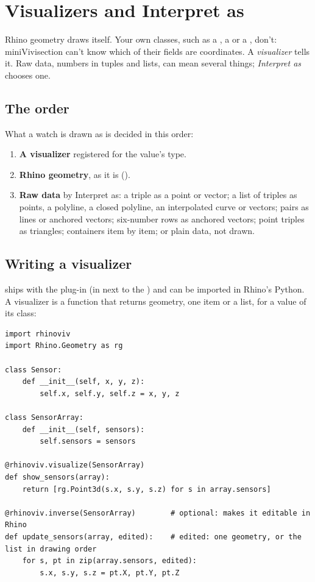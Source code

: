 \chapter{Visualizers and Interpret as}\label{ch:visualizers}

Rhino geometry draws itself. Your own classes, such as a , a  or a , don't:
miniVivisection can't know which of their fields are coordinates. A \emph{visualizer} tells it. Raw data,
numbers in tuples and lists, can mean several things; \emph{Interpret as} chooses one.

\section{The order}

What a watch is drawn as is decided in this order:

\begin{enumerate}[label=\arabic*.]
  \item \textbf{A visualizer} registered for the value's type.
  \item \textbf{Rhino geometry}, as it is ().
  \item \textbf{Raw data} by Interpret as: a triple as a point or vector; a list of triples as points, a
        polyline, a closed polyline, an interpolated curve or vectors; pairs as lines or anchored
        vectors; six-number rows as anchored vectors; point triples as triangles; containers item by
        item; or plain data, not drawn.
\end{enumerate}

\section{Writing a visualizer}

 ships with the plug-in (in  next to the ) and can be imported in
Rhino's Python. A visualizer is a function that returns geometry, one item or a list, for a value of
its class:

\begin{lstlisting}
import rhinoviv
import Rhino.Geometry as rg

class Sensor:
    def __init__(self, x, y, z):
        self.x, self.y, self.z = x, y, z

class SensorArray:
    def __init__(self, sensors):
        self.sensors = sensors

@rhinoviv.visualize(SensorArray)
def show_sensors(array):
    return [rg.Point3d(s.x, s.y, s.z) for s in array.sensors]

@rhinoviv.inverse(SensorArray)        # optional: makes it editable in Rhino
def update_sensors(array, edited):    # edited: one geometry, or the list in drawing order
    for s, pt in zip(array.sensors, edited):
        s.x, s.y, s.z = pt.X, pt.Y, pt.Z
\end{lstlisting}

